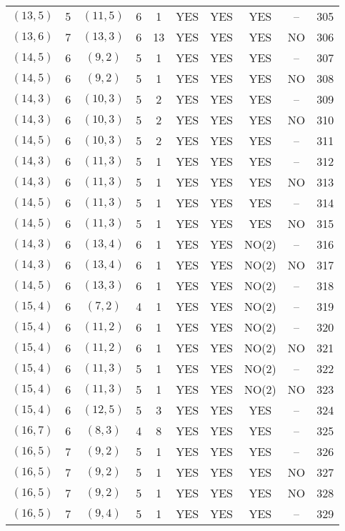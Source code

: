 \begin{longtable}{|c|c|c|c|c|c|c|c|c|c|}
$(13, 5)$ & 5 & $(11, 5)$ & 6 & 1 & YES & YES & YES & -- & 305\\
$(13, 6)$ & 7 & $(13, 3)$ & 6 & 13 & YES & YES & YES & NO & 306\\
$(14, 5)$ & 6 & $(9, 2)$ & 5 & 1 & YES & YES & YES & -- & 307\\
$(14, 5)$ & 6 & $(9, 2)$ & 5 & 1 & YES & YES & YES & NO & 308\\
$(14, 3)$ & 6 & $(10, 3)$ & 5 & 2 & YES & YES & YES & -- & 309\\
$(14, 3)$ & 6 & $(10, 3)$ & 5 & 2 & YES & YES & YES & NO & 310\\
$(14, 5)$ & 6 & $(10, 3)$ & 5 & 2 & YES & YES & YES & -- & 311\\
$(14, 3)$ & 6 & $(11, 3)$ & 5 & 1 & YES & YES & YES & -- & 312\\
$(14, 3)$ & 6 & $(11, 3)$ & 5 & 1 & YES & YES & YES & NO & 313\\
$(14, 5)$ & 6 & $(11, 3)$ & 5 & 1 & YES & YES & YES & -- & 314\\
$(14, 5)$ & 6 & $(11, 3)$ & 5 & 1 & YES & YES & YES & NO & 315\\
$(14, 3)$ & 6 & $(13, 4)$ & 6 & 1 & YES & YES & NO(2) & -- & 316\\
$(14, 3)$ & 6 & $(13, 4)$ & 6 & 1 & YES & YES & NO(2) & NO & 317\\
$(14, 5)$ & 6 & $(13, 3)$ & 6 & 1 & YES & YES & NO(2) & -- & 318\\
$(15, 4)$ & 6 & $(7, 2)$ & 4 & 1 & YES & YES & NO(2) & -- & 319\\
$(15, 4)$ & 6 & $(11, 2)$ & 6 & 1 & YES & YES & NO(2) & -- & 320\\
$(15, 4)$ & 6 & $(11, 2)$ & 6 & 1 & YES & YES & NO(2) & NO & 321\\
$(15, 4)$ & 6 & $(11, 3)$ & 5 & 1 & YES & YES & NO(2) & -- & 322\\
$(15, 4)$ & 6 & $(11, 3)$ & 5 & 1 & YES & YES & NO(2) & NO & 323\\
$(15, 4)$ & 6 & $(12, 5)$ & 5 & 3 & YES & YES & YES & -- & 324\\
$(16, 7)$ & 6 & $(8, 3)$ & 4 & 8 & YES & YES & YES & -- & 325\\
$(16, 5)$ & 7 & $(9, 2)$ & 5 & 1 & YES & YES & YES & -- & 326\\
$(16, 5)$ & 7 & $(9, 2)$ & 5 & 1 & YES & YES & YES & NO & 327\\
$(16, 5)$ & 7 & $(9, 2)$ & 5 & 1 & YES & YES & YES & NO & 328\\
$(16, 5)$ & 7 & $(9, 4)$ & 5 & 1 & YES & YES & YES & -- & 329\\

\end{longtable}
